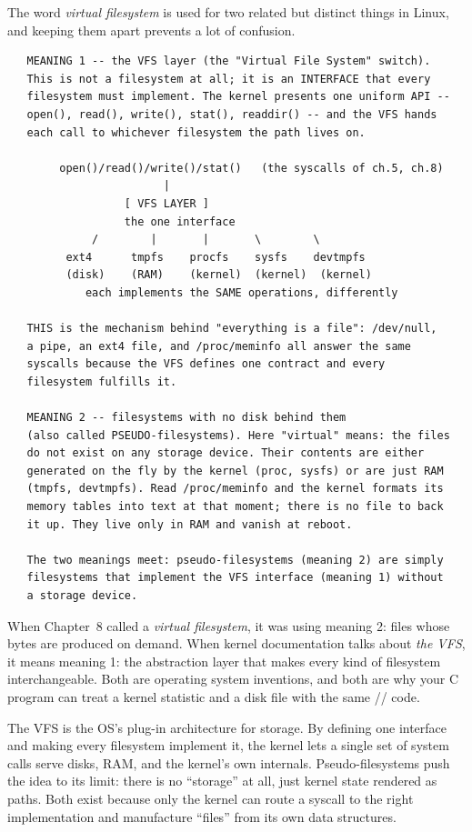 The word \emph{virtual filesystem} is used for two related but distinct
things in Linux, and keeping them apart prevents a lot of confusion.

\begin{verbatim}
   MEANING 1 -- the VFS layer (the "Virtual File System" switch).
   This is not a filesystem at all; it is an INTERFACE that every
   filesystem must implement. The kernel presents one uniform API --
   open(), read(), write(), stat(), readdir() -- and the VFS hands
   each call to whichever filesystem the path lives on.

        open()/read()/write()/stat()   (the syscalls of ch.5, ch.8)
                        |
                  [ VFS LAYER ]
                  the one interface
             /        |       |       \        \
         ext4      tmpfs    procfs    sysfs    devtmpfs
         (disk)    (RAM)    (kernel)  (kernel)  (kernel)
            each implements the SAME operations, differently

   THIS is the mechanism behind "everything is a file": /dev/null,
   a pipe, an ext4 file, and /proc/meminfo all answer the same
   syscalls because the VFS defines one contract and every
   filesystem fulfills it.

   MEANING 2 -- filesystems with no disk behind them
   (also called PSEUDO-filesystems). Here "virtual" means: the files
   do not exist on any storage device. Their contents are either
   generated on the fly by the kernel (proc, sysfs) or are just RAM
   (tmpfs, devtmpfs). Read /proc/meminfo and the kernel formats its
   memory tables into text at that moment; there is no file to back
   it up. They live only in RAM and vanish at reboot.

   The two meanings meet: pseudo-filesystems (meaning 2) are simply
   filesystems that implement the VFS interface (meaning 1) without
   a storage device.
\end{verbatim}

When Chapter~8 called  a \emph{virtual filesystem}, it was
using meaning 2: files whose bytes are produced on demand. When kernel
documentation talks about \emph{the VFS}, it means meaning 1: the
abstraction layer that makes every kind of filesystem interchangeable.
Both are operating system inventions, and both are why your C program
can treat a kernel statistic and a disk file with the same
// code.

\begin{osconcept}
The VFS is the OS's plug-in architecture for storage. By defining one
interface and making every filesystem implement it, the kernel lets a
single set of system calls serve disks, RAM, and the kernel's own
internals. Pseudo-filesystems push the idea to its limit: there is no
``storage'' at all, just kernel state rendered as paths. Both exist
because only the kernel can route a syscall to the right implementation
and manufacture ``files'' from its own data structures.
\end{osconcept}

